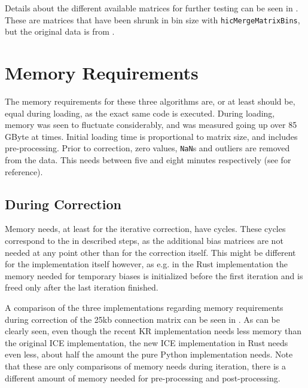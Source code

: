 
Details about the different available matrices for further testing can be seen
in . These are matrices that have been shrunk in bin size
with \verb|hicMergeMatrixBins|, but the original data is from \cite{rao20143d}.







\section{Memory Requirements}\label{sec:memory}

The memory requirements for these three algorithms are, or at least should be,
equal during loading, as the exact same code is executed. During loading,
memory was seen to fluctuate considerably, and was measured going up over 85
GByte at times. Initial loading time is proportional to matrix size, and
includes pre-processing. Prior to correction, zero values, \verb|NaN|s and
outliers are removed from the data. This needs between five and eight minutes
respectively (see  for reference).


\newpage
\subsection{During Correction}\label{sec:itermem}

Memory needs, at least for the iterative correction, have cycles. These cycles
correspond to the in  described steps, as the additional bias
matrices are not needed at any point other than for the correction itself. This
might be different for the implementation itself however, as e.g. in the Rust
implementation the memory needed for temporary biases is initialized before the
first iteration and is freed only after the last iteration finished.

A comparison of the three implementations regarding memory requirements during
correction of the 25kb connection matrix can be seen in .
As can be clearly seen, even though the recent KR implementation needs less
memory than the original ICE implementation, the new ICE implementation in Rust
needs even less, about half the amount the pure Python implementation needs.
Note that these are only comparisons of memory needs during iteration, there is
a different amount of memory needed for pre-processing and post-processing.


